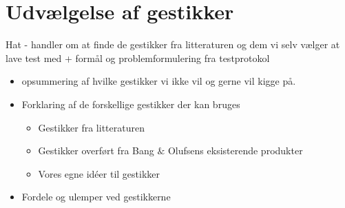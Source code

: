 \section{Udvælgelse af gestikker}
\label{UdvaelgelseAfGestikker}
%
Hat - handler om at finde de gestikker fra litteraturen og dem vi selv vælger at lave test med + formål og problemformulering fra testprotokol
%

\begin{itemize}
  \item opsummering af hvilke gestikker vi ikke vil og gerne vil kigge på.
  \item Forklaring af de forskellige gestikker der kan bruges
  \begin{itemize}
  	\item Gestikker fra litteraturen
  	\item Gestikker overført fra Bang $\&$ Olufsens eksisterende produkter
  	\item Vores egne idéer til gestikker
  \end{itemize}
  \item Fordele og ulemper ved gestikkerne
\end{itemize}